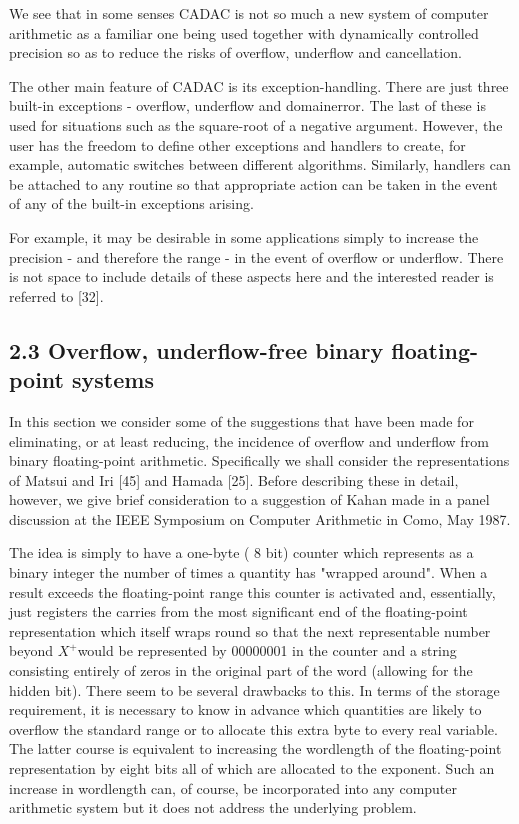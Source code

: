 \documentclass[10pt]{article}
\begin{document}
We see that in some senses CADAC is not so much a new system of computer arithmetic as a familiar one being used together with dynamically controlled precision so as to reduce the risks of overflow, underflow and cancellation.

The other main feature of CADAC is its exception-handling. There are just three built-in exceptions - overflow, underflow and domainerror. The last of these is used for situations such as the square-root of a negative argument. However, the user has the freedom to define other exceptions and handlers to create, for example, automatic switches between different algorithms. Similarly, handlers can be attached to any routine so that appropriate action can be taken in the event of any of the built-in exceptions arising.

For example, it may be desirable in some applications simply to increase the precision - and therefore the range - in the event of overflow or underflow. There is not space to include details of these aspects here and the interested reader is referred to [32].

\subsection*{2.3 Overflow, underflow-free binary floating-point systems}
In this section we consider some of the suggestions that have been made for eliminating, or at least reducing, the incidence of overflow and underflow from binary floating-point arithmetic. Specifically we shall consider the representations of Matsui and Iri [45] and Hamada [25]. Before describing these in detail, however, we give brief consideration to a suggestion of Kahan made in a panel discussion at the IEEE Symposium on Computer Arithmetic in Como, May 1987.

The idea is simply to have a one-byte ( 8 bit) counter which represents as a binary integer the number of times a quantity has "wrapped around". When a result exceeds the floating-point range this counter is activated and, essentially, just registers the carries from the most significant end of the floating-point representation which itself wraps round so that the next representable number beyond $X^{+}$would be represented by 00000001 in the counter and a string consisting entirely of zeros in the original part of the word (allowing for the hidden bit). There seem to be several drawbacks to this. In terms of the storage requirement, it is necessary to know in advance which quantities are likely to overflow the standard range or to allocate this extra byte to every real variable. The latter course is equivalent to increasing the wordlength of the floating-point representation by eight bits all of which are allocated to the exponent. Such an increase in wordlength can, of course, be incorporated into any computer arithmetic system but it does not address the underlying problem.
\end{document}
